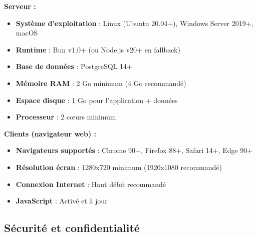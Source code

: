 \begin{tcolorbox}[colback=blue!5!white,colframe=blue!75!black,title=Configuration système minimale]

\textbf{Serveur :}
\begin{itemize}[leftmargin=*]
    \item \textbf{Système d'exploitation} : Linux (Ubuntu 20.04+), Windows Server 2019+, macOS
    \item \textbf{Runtime} : Bun v1.0+ (ou Node.js v20+ en fallback)
    \item \textbf{Base de données} : PostgreSQL 14+
    \item \textbf{Mémoire RAM} : 2 Go minimum (4 Go recommandé)
    \item \textbf{Espace disque} : 1 Go pour l'application + données
    \item \textbf{Processeur} : 2 cœurs minimum
\end{itemize}

\textbf{Clients (navigateur web) :}
\begin{itemize}[leftmargin=*]
    \item \textbf{Navigateurs supportés} : Chrome 90+, Firefox 88+, Safari 14+, Edge 90+
    \item \textbf{Résolution écran} : 1280x720 minimum (1920x1080 recommandé)
    \item \textbf{Connexion Internet} : Haut débit recommandé
    \item \textbf{JavaScript} : Activé et à jour
\end{itemize}
\end{tcolorbox}

\subsection{Sécurité et confidentialité}

